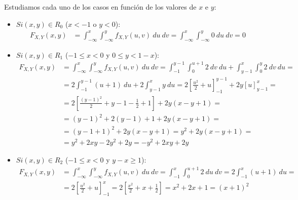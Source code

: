 \documentclass[12pt]{article}
\begin{document}
\begin{ejercicio}[5 puntos]
\begin{enumerate}
            Estudiamos cada uno de los casos en función de los valores de $x$ e $y$:
            \begin{itemize}
                \item \ul{$Si (x,y)\in R_0$} ($x<-1$ o $y<0$):
                \begin{align*}
                    F_{X,Y}(x,y) &= \int_{-\infty}^{x}\int_{-\infty}^{y} f_{X,Y}(u,v) \ du \ dv
                    = \int_{-\infty}^{x}\int_{-\infty}^{y} 0 \ du \ dv = 0
                \end{align*}

                \item \ul{$Si (x,y)\in R_1$} ($-1\leq x<0$ y $0\leq y<1-x$):
                \begin{align*}
                    F_{X,Y}(x,y) &= \int_{-\infty}^{x}\int_{-\infty}^{y} f_{X,Y}(u,v) \ du \ dv
                    = \int_{-1}^{y-1}\int_{0}^{u+1} 2 \ dv \ du + \int_{y-1}^{x}\int_{0}^{y} 2 \ dv \ du
                    =\\&= 2\int_{-1}^{y-1} (u+1) \ du + 2\int_{y-1}^{x} y \ du
                    = 2\left[\frac{u^2}{2}+u\right]_{-1}^{y-1} + 2y\left[u\right]_{y-1}^{x}
                    =\\&= 2\left[\frac{(y-1)^2}{2} + y-1-\frac{1}{2}+1\right] + 2y(x-y+1)
                    =\\&= (y-1)^2 + 2(y-1) + 1 + 2y(x-y+1)
                    =\\&= (y-1+1)^2 + 2y(x-y+1) = y^2 + 2y(x-y+1)
                    =\\&= y^2 + 2xy - 2y^2 + 2y
                    = -y^2 + 2xy + 2y
                \end{align*}

                \item \ul{$Si (x,y)\in R_2$} ($-1\leq x<0$ y $y-x\geq 1$):
                \begin{align*}
                    F_{X,Y}(x,y) &= \int_{-\infty}^{x}\int_{-\infty}^{y} f_{X,Y}(u,v) \ du \ dv
                    = \int_{-1}^{x}\int_{0}^{u+1} 2 \ du \ dv
                    = 2\int_{-1}^{x} (u+1) \ du
                    =\\&= 2\left[\frac{u^2}{2}+u\right]_{-1}^{x}
                    = 2\left[\frac{x^2}{2}+x+\frac{1}{2}\right]
                    = x^2 + 2x + 1 = (x+1)^2
                \end{align*}


\end{itemize}
\end{enumerate}
\end{ejercicio}
\end{document}
